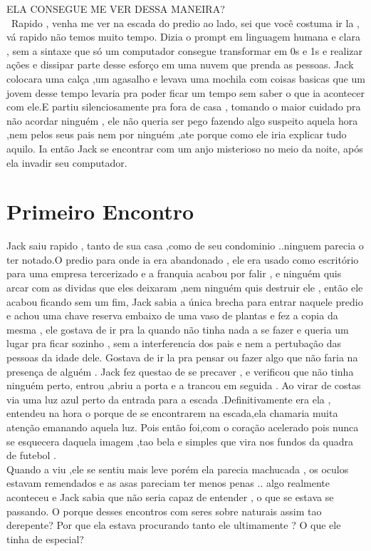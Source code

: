 \documentclass{book}
\begin{document}
 ELA CONSEGUE ME VER DESSA MANEIRA? \\
 
~Rapido , venha me ver na escada do predio ao lado, sei que você costuma ir la , vá rapido não temos muito tempo. Dizia o prompt em linguagem humana e clara , sem a sintaxe que só um computador consegue transformar em 0s e 1s e realizar ações e dissipar parte desse esforço em uma nuvem que prenda as pessoas. 
Jack colocara uma calça ,um agasalho e levava uma mochila com coisas basicas que um jovem desse tempo levaria pra poder ficar um tempo sem saber o que ia acontecer com ele.E partiu silenciosamente pra fora de casa , tomando o maior cuidado pra não acordar ninguém , ele não queria ser pego fazendo algo suspeito aquela hora ,nem pelos seus pais nem por ninguém ,ate porque como ele iria explicar tudo aquilo.
Ia então Jack se encontrar com um anjo misterioso no meio da noite, após ela invadir seu computador.
\section*{Primeiro Encontro}
Jack saiu rapido , tanto de sua casa ,como de seu condominio ..ninguem parecia o ter notado.O predio para onde ia era abandonado , ele era usado como escritório para uma empresa tercerizado e a franquia acabou por falir , e ninguém quis arcar com as dividas que eles deixaram ,nem ninguém quis destruir ele , então ele acabou ficando sem um fim, Jack sabia a única brecha para entrar naquele predio e achou uma chave reserva embaixo de uma vaso de plantas e fez a copia da mesma , ele gostava de ir pra la quando não tinha nada a se fazer e queria um lugar pra ficar sozinho , sem a interferencia dos pais e nem a pertubação das pessoas da idade dele. Gostava de ir la pra pensar ou fazer algo que não faria na presença de alguém . Jack fez questao de se precaver , e verificou que não tinha ninguém perto, entrou ,abriu a porta e a trancou em seguida . Ao virar de costas via uma luz azul perto da entrada para a escada .Definitivamente era ela , entendeu na hora o porque de se encontrarem na escada,ela chamaria muita atenção emanando aquela luz. Pois então foi,com o coração acelerado pois nunca se esquecera daquela imagem ,tao bela e simples que vira nos fundos da quadra de futebol . \\
Quando a viu ,ele se sentiu mais leve porém ela parecia machucada , os oculos estavam remendados e as asas pareciam ter menos penas .. algo realmente aconteceu e Jack sabia que não seria capaz de entender , o que se estava se passando. O porque desses encontros com seres sobre naturais assim tao derepente? Por que ela estava procurando tanto ele ultimamente ? O que ele tinha de especial?\\
\end{document}
